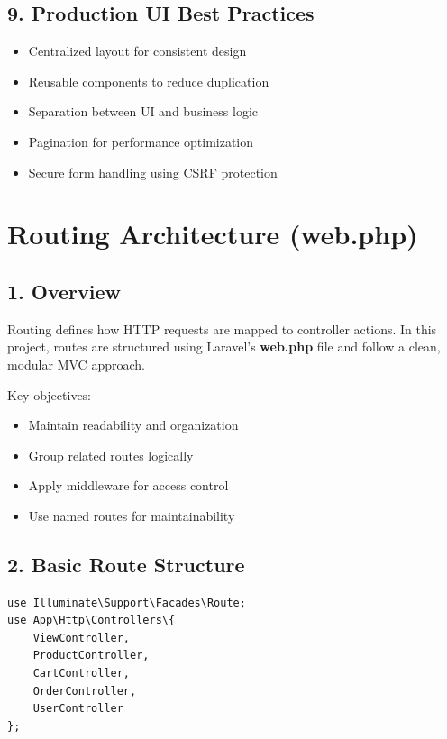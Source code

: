 \documentclass[12pt,a4paper]{article}
\begin{document}
\subsection{9. Production UI Best Practices}

\begin{itemize}[noitemsep]
    \item Centralized layout for consistent design
    \item Reusable components to reduce duplication
    \item Separation between UI and business logic
    \item Pagination for performance optimization
    \item Secure form handling using CSRF protection
\end{itemize}


\section{Routing Architecture (web.php)}

\subsection{1. Overview}

Routing defines how HTTP requests are mapped to controller actions. In this project, routes are structured using Laravel's \textbf{web.php} file and follow a clean, modular MVC approach.

Key objectives:
\begin{itemize}[noitemsep]
    \item Maintain readability and organization
    \item Group related routes logically
    \item Apply middleware for access control
    \item Use named routes for maintainability
\end{itemize}

\subsection{2. Basic Route Structure}

\begin{verbatim}
use Illuminate\Support\Facades\Route;
use App\Http\Controllers\{
    ViewController,
    ProductController,
    CartController,
    OrderController,
    UserController
};
\end{verbatim}
\end{document}
